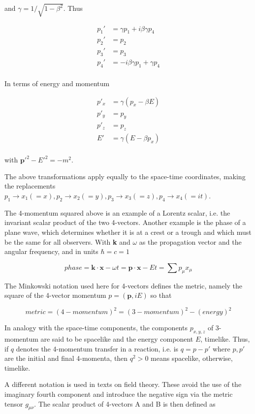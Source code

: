 \documentclass[en, device=normal]{elegantnote}
\begin{document}
and $\gamma=1/\sqrt{1-\beta^2}$. Thus 

$$
\begin{aligned}
  p_1'&=\gamma p_1+i\beta\gamma p_4 \\
  p_2'&=p_2 \\
  p_3'&=p_3 \\
  p_4'&=-i\beta\gamma p_1+\gamma p_4 \\
\end{aligned}
$$

In terms of energy and momentum 

$$\begin{aligned}
  p'_x&=\gamma(p_x-\beta E) \\
  p'_y&=p_y \\
  p'_z&=p_z \\
  E'&=\gamma(E-\beta p_x) \\
\end{aligned}$$

with $\textbf{p}'^2-E'^2=-m^2$.

The above transformations apply equally to the space-time coordinates, making the 
replacements $p_1\rightarrow x_1(=x),p_2\rightarrow x_2(=y),p_3\rightarrow x_3(=z),p_4\rightarrow x_4(=it)$.

The 4-momentum squared above is an example of a Lorentz scalar, i.e. the invariant 
scalar product of the two 4-vectors. Another example is the phase of a plane wave, 
which determines whether it is at a crest or a trough and which must be the same for 
all observers. With \textbf{k} and $\omega$ as the propagation vector and the angular 
frequency, and in units $\hbar=c=1$

$$phase=\textbf{k}\cdot\textbf{x}-\omega t=\textbf{p}\cdot\textbf{x}-Et=\sum p_\mu x_\mu$$

The Minkowski notation used here for 4-vectors defines the metric, namely the square of 
the 4-vector momentum $p=(\textbf{p},iE)$ so that 

$$metric=(4-momentum)^2=(3-momentum)^2-(energy)^2$$

In analogy with the space-time components, the components $p_{x,y,z}$ of 3-momentum 
are said to be spacelike and the energy component $E$, timelike. Thus, if $q$ denotes 
the 4-momentum transfer in a reaction, i.e. is $q=p-p'$ where $p,p'$ are the initial 
and final 4-momenta, then $q^2>0$ means spacelike, otherwise, timelike.

A different notation is used in texts on field theory. These avoid the use of the imaginary 
fourth component and introduce the negative sign via the metric tensor $g_{\mu\nu}$. 
The scalar product of 4-vectors A and B is then defined as 
\end{document}
